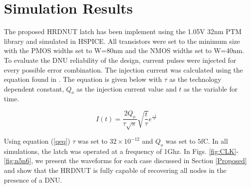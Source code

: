 \section{Simulation Results} \label{sec:res}
The proposed HRDNUT latch has been implement using the 1.05V 32nm PTM library \cite{PTM} and simulated in HSPICE. All transistors were set to the minimum size with the PMOS widths set to W=80nm and the NMOS widths set to W=40nm. To evaluate the DNU reliability of the design, current pulses were injected for every possible error combination. The injection current was calculated using the equation found in \cite{injeq}. The equation is given below with $\tau$ as the technology dependent constant, $Q_o$ as the injection current value and $t$ as the variable for time. 

\begin{equation}\label{qeq}
I(t)=\frac{2Q_o}{\tau\sqrt{\pi}}\sqrt{\frac{t}{\tau}}e^{\frac{-t}{\tau}}
\end{equation}

Using equation (\ref{qeq}) $\tau$ was set to $32\times10^{-12}$ and $Q_o$ was set to $5\text{fC}$. In all simulations, the latch was operated at a frequency of 1Ghz. In Figs. \ref{fig:CLK}-\ref{fig:n5n6}, we present the waveforms for each case discussed in Section \ref{Proposed} and show that the HRDNUT is fully capable of recovering all nodes in the presence of a DNU. 

